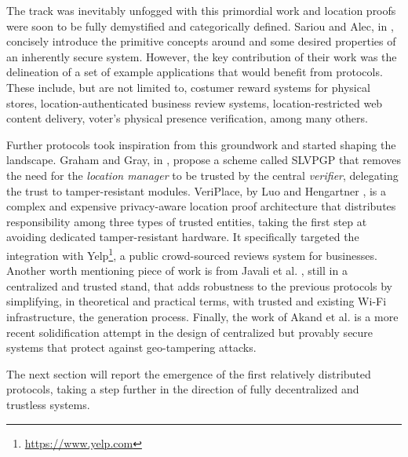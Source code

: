 The \pol{} track was inevitably unfogged with this primordial work and location proofs were soon to be fully demystified and categorically defined. Sariou and Alec, in \cite{saroiu2009enabling}, concisely introduce the primitive concepts around \pol{} and some desired properties of an inherently secure system. However, the key contribution of their work was the delineation of a set of example applications that would benefit from \pol{} protocols. These include, but are not limited to, costumer reward systems for physical stores, location-authenticated business review systems, location-restricted web content delivery, voter's physical presence verification, among many others.

Further protocols took inspiration from this groundwork and started shaping the landscape. Graham and Gray, in \cite{graham2009protecting}, propose a \pol{} scheme called SLVPGP that removes the need for the \emph{location manager} to be trusted by the central \emph{verifier}, delegating the trust to tamper-resistant modules. VeriPlace, by Luo and Hengartner \cite{luo2010veriplace}, is a complex and expensive privacy-aware location proof architecture that distributes responsibility among three types of trusted entities, taking the first step at avoiding dedicated tamper-resistant hardware. It specifically targeted the integration with Yelp\footnote{\url{https://www.yelp.com}}, a public crowd-sourced reviews system for businesses. Another worth mentioning piece of work is from Javali et al. \cite{javali2016alice}, still in a centralized and trusted stand, that adds robustness to the previous protocols by simplifying, in theoretical and practical terms, with trusted and existing Wi-Fi infrastructure, the \pol{} generation process. Finally, the work of Akand et al. \cite{akand2021privacy} is a more recent solidification attempt in the design of centralized but provably secure \pol{} systems that protect against geo-tampering attacks.

The next section will report the emergence of the first relatively distributed \pol{} protocols, taking a step further in the direction of fully decentralized and trustless systems.